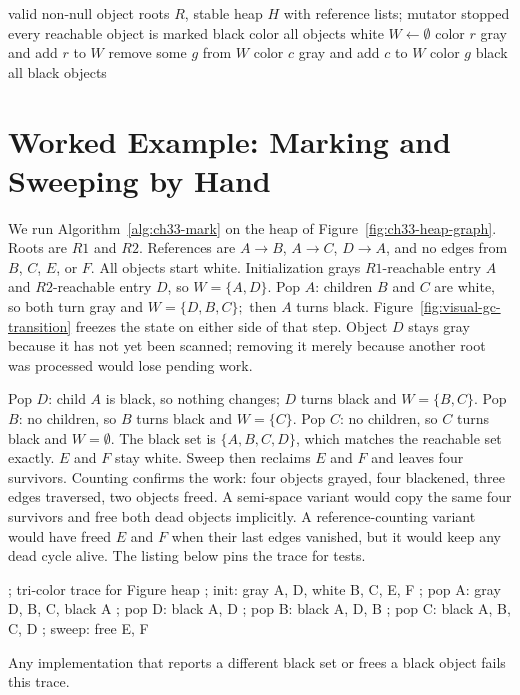 \begin{algorithm}[htbp]
\caption{Tri-color marking with an explicit worklist}\label{alg:ch33-mark}
\begin{pseudocode}
\Require valid non-null object roots $R$, stable heap $H$ with reference lists; mutator stopped
\Ensure every reachable object is marked black
\State color all objects white
\State $W \gets \emptyset$
\State color $r$ gray and add $r$ to $W$
\EndIf
\EndFor
{}
\State remove some $g$ from $W$
\State color $c$ gray and add $c$ to $W$
\EndIf
\EndFor
\State color $g$ black
\EndWhile
\State \Return all black objects
\end{pseudocode}
\end{algorithm}

\section{Worked Example: Marking and Sweeping by Hand}\label{sec:ch33-worked}

We run Algorithm~\ref{alg:ch33-mark} on the heap of Figure~\ref{fig:ch33-heap-graph}.
Roots are $R1$ and $R2$.
References are $A \to B$, $A \to C$, $D \to A$, and no edges from $B$, $C$, $E$, or $F$.
All objects start white.
Initialization grays $R1$-reachable entry $A$ and $R2$-reachable entry $D$, so $W = \{A, D\}$.
Pop $A$: children $B$ and $C$ are white, so both turn gray and $W = \{D, B, C\};$ then $A$ turns black.
Figure~\ref{fig:visual-gc-transition} freezes the state on either side of that step.
Object $D$ stays gray because it has not yet been scanned; removing it merely because another root was processed would lose pending work.



Pop $D$: child $A$ is black, so nothing changes; $D$ turns black and $W = \{B, C\}$.
Pop $B$: no children, so $B$ turns black and $W = \{C\}$.
Pop $C$: no children, so $C$ turns black and $W = \emptyset$.
The black set is $\{A, B, C, D\}$, which matches the reachable set exactly.
$E$ and $F$ stay white.
Sweep then reclaims $E$ and $F$ and leaves four survivors.
Counting confirms the work: four objects grayed, four blackened, three edges traversed, two objects freed.
A semi-space variant would copy the same four survivors and free both dead objects implicitly.
A reference-counting variant would have freed $E$ and $F$ when their last edges vanished, but it would keep any dead cycle alive.
The listing below pins the trace for tests.
\begin{irlisting}
; tri-color trace for Figure heap
; init: gray {A, D}, white {B, C, E, F}
; pop A: gray {D, B, C}, black {A}
; pop D: black {A, D}
; pop B: black {A, D, B}
; pop C: black {A, B, C, D}
; sweep: free {E, F}
\end{irlisting}
Any implementation that reports a different black set or frees a black object fails this trace.

